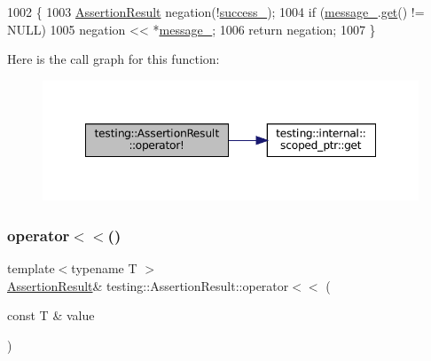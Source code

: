 \begin{DoxyCode}
1002                                                  \{
1003   \hyperlink{classtesting_1_1AssertionResult_a27788116f03f90aec4daf592fd809ead}{AssertionResult} negation(!\hyperlink{classtesting_1_1AssertionResult_ae7348f9fffe7a20980dfc94fc261d7ca}{success\_});
1004   \textcolor{keywordflow}{if} (\hyperlink{classtesting_1_1AssertionResult_a5dee995939457def35f0bf496d070957}{message\_}.\hyperlink{classtesting_1_1internal_1_1scoped__ptr_aa5984291e12453f1e81b7676d1fa26fd}{get}() != NULL)
1005     negation << *\hyperlink{classtesting_1_1AssertionResult_a5dee995939457def35f0bf496d070957}{message\_};
1006   \textcolor{keywordflow}{return} negation;
1007 \}
\end{DoxyCode}
Here is the call graph for this function\+:
\nopagebreak
\begin{figure}[H]
\begin{center}
\leavevmode
\includegraphics[width=348pt]{classtesting_1_1AssertionResult_a5b0784686a756660ac8dfe528d89386b_cgraph}
\end{center}
\end{figure}
\mbox{\label{classtesting_1_1AssertionResult_a3230efa81aafe7c61f5fb878cfa39e91}} 
\subsubsection{\texorpdfstring{operator$<$$<$()}{operator<<()}\hspace{0.1cm}{\footnotesize\ttfamily [1/2]}}
{\footnotesize\ttfamily template$<$typename T $>$ \\
\hyperlink{classtesting_1_1AssertionResult}{Assertion\+Result}\& testing\+::\+Assertion\+Result\+::operator$<$$<$ (\begin{DoxyParamCaption}\item[{const T \&}]{value }\end{DoxyParamCaption})\hspace{0.3cm}{\ttfamily [inline]}}



